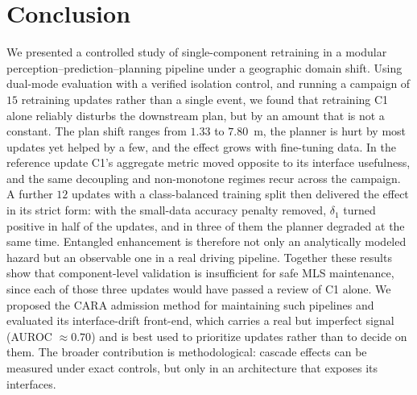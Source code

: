 \documentclass[conference]{IEEEtran}
\begin{document}
\section{Conclusion}
\label{sec:conclusion}
We presented a controlled study of single-component retraining in a modular
perception--prediction--planning pipeline under a geographic domain shift. Using
dual-mode evaluation with a verified isolation control, and running a campaign of
$15$ retraining updates rather than a single event, we found that retraining C1
alone reliably disturbs the downstream plan, but by an amount that is not a
constant. The plan shift ranges from $1.33$ to $7.80$~m, the planner is hurt by
most updates yet helped by a few, and the effect grows with fine-tuning data. In
the reference update C1's aggregate metric moved opposite to its interface
usefulness, and the same decoupling and non-monotone regimes recur across the
campaign. A further $12$ updates with a class-balanced training split then
delivered the effect in its strict form: with the small-data accuracy penalty
removed, $\delta_1$ turned positive in half of the updates, and in three of them
the planner degraded at the same time. Entangled enhancement is therefore not
only an analytically modeled hazard but an observable one in a real driving
pipeline. Together these results show that component-level validation is
insufficient for safe MLS maintenance, since each of those three updates would
have passed a review of C1 alone. We proposed the CARA admission method for
maintaining such pipelines and evaluated its interface-drift front-end, which
carries a real but imperfect signal (AUROC $\approx 0.70$) and is best used to
prioritize updates rather than to decide on them. The broader contribution is
methodological: cascade effects can be measured under exact controls, but only in
an architecture that exposes its interfaces.



\end{document}

